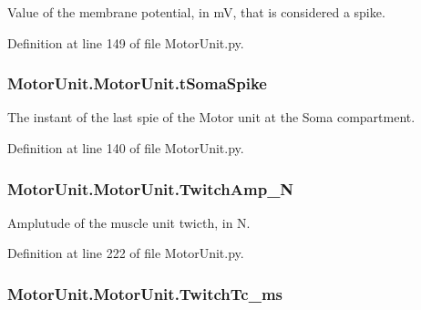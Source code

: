 Value of the membrane potential, in m\-V, that is considered a spike. 



Definition at line 149 of file Motor\-Unit.\-py.

\hypertarget{class_motor_unit_1_1_motor_unit_abca82ec2c7312bb475989bb45e82ca28}{
\subsubsection[{t\-Soma\-Spike}]{\setlength{\rightskip}{0pt plus 5cm}Motor\-Unit.\-Motor\-Unit.\-t\-Soma\-Spike}}\label{class_motor_unit_1_1_motor_unit_abca82ec2c7312bb475989bb45e82ca28}


The instant of the last spie of the Motor unit at the Soma compartment. 



Definition at line 140 of file Motor\-Unit.\-py.

\hypertarget{class_motor_unit_1_1_motor_unit_ad14af870eb3dd7468041853f2c6e8cab}{
\subsubsection[{Twitch\-Amp\-\_\-\-N}]{\setlength{\rightskip}{0pt plus 5cm}Motor\-Unit.\-Motor\-Unit.\-Twitch\-Amp\-\_\-\-N}}\label{class_motor_unit_1_1_motor_unit_ad14af870eb3dd7468041853f2c6e8cab}


Amplutude of the muscle unit twicth, in N. 



Definition at line 222 of file Motor\-Unit.\-py.

\hypertarget{class_motor_unit_1_1_motor_unit_a083581c89ebb964e58721667307dd2bc}{
\subsubsection[{Twitch\-Tc\-\_\-ms}]{\setlength{\rightskip}{0pt plus 5cm}Motor\-Unit.\-Motor\-Unit.\-Twitch\-Tc\-\_\-ms}}\label{class_motor_unit_1_1_motor_unit_a083581c89ebb964e58721667307dd2bc}


